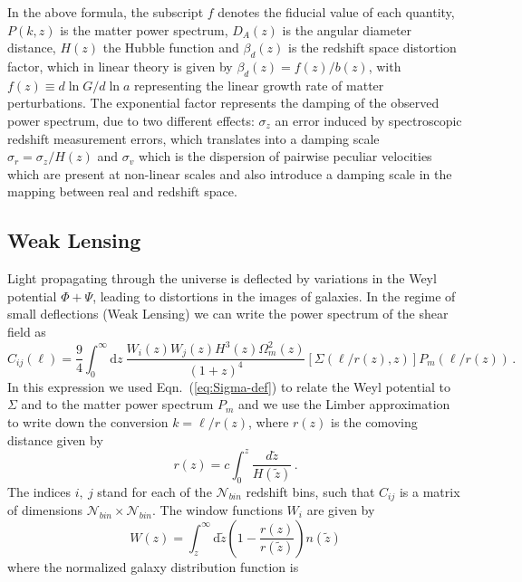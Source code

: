 In the above formula, the subscript $f$ denotes the fiducial value
of each quantity, $P(k,z)$ is the matter power spectrum, $D_{A}(z)$
is the angular diameter distance, $H(z)$ the Hubble function and
$\beta_{d}(z)$ is the redshift space distortion factor, which in
linear theory is given by $\beta_{d}(z)=f(z)/b(z)$, with $f(z)\equiv d\ln G/d\ln a$
representing the linear growth rate of matter perturbations. The exponential
factor represents the damping of the observed power spectrum, due
to two different effects: $\sigma_{z}$ an error induced by spectroscopic
redshift measurement errors, which translates into a damping scale
$\sigma_{r}=\sigma_{z}/H(z)$ and $\sigma_{v}$ which is the dispersion
of pairwise peculiar velocities which are present at non-linear scales
and also introduce a damping scale in the mapping between real and
redshift space.


\subsection{Weak Lensing \label{sub:Fisher-Weak-Lensing}}

Light propagating through the universe is deflected by variations in the Weyl potential $\Phi+\Psi$,
leading to distortions in the images of galaxies. In the regime of small deflections (Weak Lensing) we
can write the power spectrum of the shear field as
\begin{equation}
\label{def_shear}
C_{ij}(\ell)=\frac{9}{4}\int_{0}^{\infty}\mbox{d}z\:\frac{W_{i}(z)W_{j}(z)H^{3}(z)\Omega_{m}^{2}(z)}{(1+z)^{4}}\left[\Sigma(\ell/r(z),z)\right]P_{m}(\ell/r(z)) \, .
\end{equation}
In this expression we used Eqn.\ (\ref{eq:Sigma-def}) to relate the Weyl potential to $\Sigma$ and
to the matter power spectrum $P_m$ and we use the Limber approximation to write down the conversion $k=\ell/r(z)$, where $r(z)$ is the comoving
distance given by
\begin{equation}
r(z) = c\int_0^z \frac{d\tilde{z}}{H(\tilde{z})} \, .
\end{equation}
The indices $i,\:j$ stand for each of the $\mathcal{N}_{bin}$
redshift bins, such that $C_{ij}$ is a matrix of dimensions $\mathcal{N}_{bin}\times\mathcal{N}_{bin}$. The window functions $W_i$ are given by
\begin{equation}
W(z)=\int_{z}^{\infty}\mbox{d}\tilde{z}\left(1-\frac{r(z)}{r(\tilde{z})}\right)n(\tilde{z})
\end{equation}
where the normalized galaxy distribution function is

